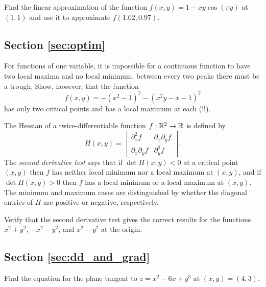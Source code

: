 \documentclass[svgnames]{watsonbook}
\begin{document}
\begin{exercise}{}{}
  Find the linear approximation of the function
  $f(x,y) = 1-xy\cos(\pi y)$ at $(1,1)$ and use it to approximate
  $f(1.02,0.97)$.
\end{exercise}



\subsection*{Section \ref{sec:optim}}

\begin{exercise}{}{}
  For functions of one variable, it is impossible for a continuous
  function to have two local maxima and no local minimum: between
  every two peaks there must be a trough. Show, however, that the
  function
  \[
    f(x,y) = -(x^2-1)^2-(x^2y-x-1)^2
  \]
  has only two critical points and has a local maximum at each (!!). 
\end{exercise}


\begin{exercise}{}{}
  The Hessian of a twice-differentiable function $f:\mathbb{R}^2 \to \mathbb{R}$ is
  defined by
  \[
    H(x,y) = \left[
      \begin{array}{cc}
        \partial_x^2 f & \partial_x\partial_y f \\
        \partial_x\partial_y f & \partial_y^2 f
      \end{array}
    \right]. 
  \]
  The \textit{second derivative test} says that if $\det H(x,y)  < 0$ at
  a critical point $(x,y)$ then $f$ has neither local minimum nor a
  local maximum at $(x,y)$, and if $\det H(x,y)  > 0$ then $f$ has a
  local minimum or a local maximum at $(x,y)$. The minimum and maximum
  cases are distinguished by whether the diagonal entries of $H$ are
  positive or negative, respectively.

  Verify that the second derivative test gives the correct results for
  the functions $x^2+y^2$, $-x^2-y^2$, and $x^2 - y^2$ at the origin. 
\end{exercise}

\subsection*{Section \ref{sec:dd_and_grad}}

\begin{exercise}{}{}
  Find the equation for the plane tangent to $z=x^2-6x+y^3$ at
  $(x,y) = (4,3)$.
\end{exercise}
\end{document}
